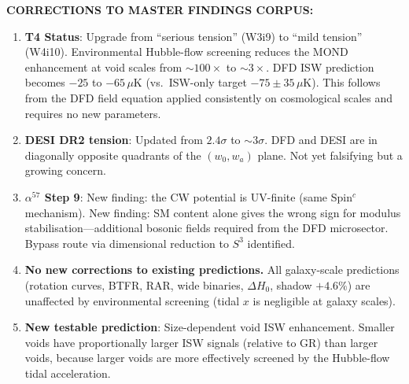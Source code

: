 \documentclass[11pt,a4paper]{article}
\begin{document}
\begin{tcolorbox}[colback=yellow!5!white, colframe=blue!70!black,
  title=\textbf{W4i10 Impact on Master Findings}]

\textbf{CORRECTIONS TO MASTER FINDINGS CORPUS:}

\begin{enumerate}
\item \textbf{T4 Status}: Upgrade from ``serious tension'' (W3i9) to
  ``mild tension'' (W4i10). Environmental Hubble-flow screening
  reduces the MOND enhancement at void scales from $\sim 100\times$
  to $\sim 3\times$. DFD ISW prediction becomes $-25$ to $-65\,\mu$K
  (vs.\ ISW-only target $-75 \pm 35\,\mu$K). This follows from
  the DFD field equation applied consistently on cosmological scales
  and requires no new parameters.

\item \textbf{DESI DR2 tension}: Updated from $2.4\sigma$ to
  $\sim 3\sigma$. DFD and DESI are in diagonally opposite quadrants
  of the $(w_0, w_a)$ plane. Not yet falsifying but a growing
  concern.

\item \textbf{$\alpha^{57}$ Step 9}: New finding: the CW potential
  is UV-finite (same Spin$^c$ mechanism). New finding: SM content
  alone gives the wrong sign for modulus stabilisation---additional
  bosonic fields required from the DFD microsector. Bypass route
  via dimensional reduction to $S^3$ identified.

\item \textbf{No new corrections to existing predictions.} All
  galaxy-scale predictions (rotation curves, BTFR, RAR, wide binaries,
  $\Delta H_0$, shadow $+4.6\%$) are unaffected by environmental
  screening (tidal $x$ is negligible at galaxy scales).

\item \textbf{New testable prediction}: Size-dependent void ISW
  enhancement. Smaller voids have proportionally larger ISW signals
  (relative to GR) than larger voids, because larger voids are more
  effectively screened by the Hubble-flow tidal acceleration.
\end{enumerate}

\end{tcolorbox}
\end{document}
